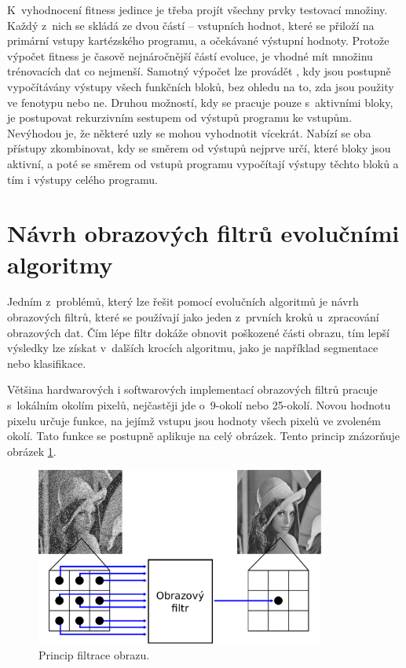 K~vyhodnocení fitness jedince je třeba projít všechny prvky testovací množiny. Každý z~nich se skládá ze dvou částí -- vstupních hodnot, které se přiloží na primární vstupy kartézského programu, a očekávané výstupní hodnoty. Protože výpočet fitness je časově nejnáročnější částí evoluce, je vhodné mít množinu trénovacích dat co nejmenší. Samotný výpočet lze provádět , kdy jsou postupně vypočítávány výstupy všech funkčních bloků, bez ohledu na to, zda jsou použity ve fenotypu nebo ne. Druhou možností, kdy se pracuje pouze s~aktivními bloky, je postupovat rekurzivním sestupem od výstupů programu ke vstupům. Nevýhodou je, že některé uzly se mohou vyhodnotit vícekrát. Nabízí se oba přístupy zkombinovat, kdy se směrem od výstupů nejprve určí, které bloky jsou aktivní, a poté se směrem od vstupů programu vypočítají výstupy těchto bloků a tím i výstupy celého programu.

\section{Návrh obrazových filtrů evolučními algoritmy}

Jedním z~problémů, který lze řešit pomocí evolučních algoritmů je návrh obrazových filtrů, které se používají jako jeden z~prvních kroků u~zpracování obrazových dat. Čím lépe filtr dokáže obnovit poškozené části obrazu, tím lepší výsledky lze získat v~dalších krocích algoritmu, jako je například segmentace nebo klasifikace.

Většina hardwarových i softwarových implementací obrazových filtrů pracuje s~lokálním okolím pixelů, nejčastěji jde o~9-okolí nebo 25-okolí. Novou hodnotu pixelu určuje funkce, na jejímž vstupu jsou hodnoty všech pixelů ve zvoleném okolí. Tato funkce se postupně aplikuje na celý obrázek. Tento princip znázorňuje obrázek \ref{obrIFokoli}.

\begin{figure}[htb]
    \centering\includegraphics[width=0.85\textwidth]{fig/filter.pdf}
    \caption{Princip filtrace obrazu.}
    \label{obrIFokoli}
\end{figure}

